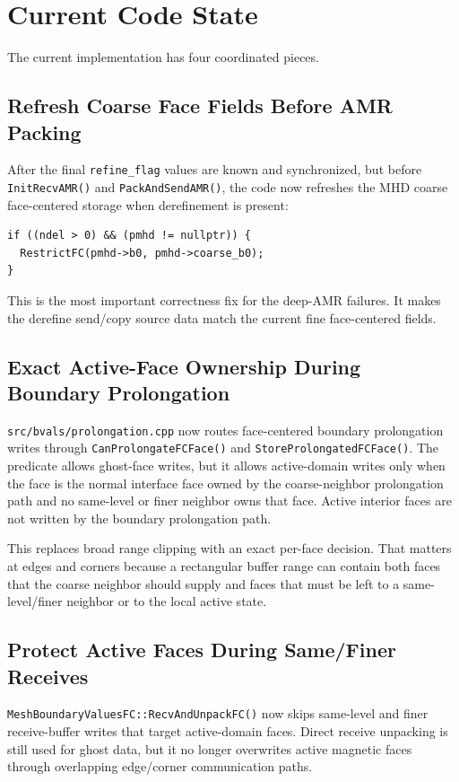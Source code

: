 \documentclass[11pt]{article}
\newcommand{\code}[1]{\texttt{#1}}
\begin{document}
\section{Current Code State}

The current implementation has four coordinated pieces.

\subsection{Refresh Coarse Face Fields Before AMR Packing}

After the final \code{refine\_flag} values are known and synchronized, but before
\code{InitRecvAMR()} and \code{PackAndSendAMR()}, the code now refreshes the MHD
coarse face-centered storage when derefinement is present:
\begin{verbatim}
if ((ndel > 0) && (pmhd != nullptr)) {
  RestrictFC(pmhd->b0, pmhd->coarse_b0);
}
\end{verbatim}
This is the most important correctness fix for the deep-AMR failures.  It makes
the derefine send/copy source data match the current fine face-centered fields.

\subsection{Exact Active-Face Ownership During Boundary Prolongation}

\code{src/bvals/prolongation.cpp} now routes face-centered boundary
prolongation writes through \code{CanProlongateFCFace()} and
\code{StoreProlongatedFCFace()}.  The predicate allows ghost-face writes, but it
allows active-domain writes only when the face is the normal interface face
owned by the coarse-neighbor prolongation path and no same-level or finer
neighbor owns that face.  Active interior faces are not written by the boundary
prolongation path.

This replaces broad range clipping with an exact per-face decision.  That
matters at edges and corners because a rectangular buffer range can contain both
faces that the coarse neighbor should supply and faces that must be left to a
same-level/finer neighbor or to the local active state.

\subsection{Protect Active Faces During Same/Finer Receives}

\code{MeshBoundaryValuesFC::RecvAndUnpackFC()} now skips same-level and finer
receive-buffer writes that target active-domain faces.  Direct receive unpacking
is still used for ghost data, but it no longer overwrites active magnetic faces
through overlapping edge/corner communication paths.
\end{document}
